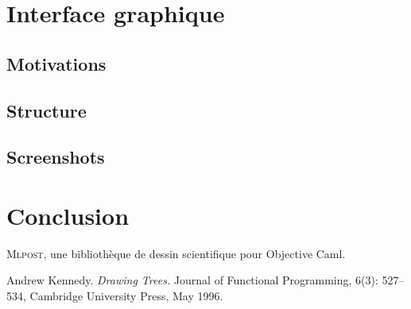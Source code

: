 \documentclass[a4paper,12pt]{article}
\newcommand{\mlpost}{\textsc{Mlpost}}
\begin{document}
\cite{tree}

\section{Interface graphique}
\subsection{Motivations}
\subsection{Structure}
\subsection{Screenshots}
\section{Conclusion}

\begin{thebibliography}{99}
 \mlpost, une bibliothèque de dessin 
 scientifique pour Objective Caml.

Andrew Kennedy. 
\emph{Drawing Trees.}
Journal of Functional Programming, 
6(3): 527--534, Cambridge University Press, May 1996.
\end{thebibliography}
\end{document}

